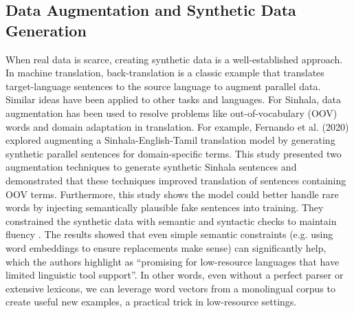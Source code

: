 \documentclass[12pt]{uomthesis}
\begin{document}
\subsection{Data Augmentation and Synthetic Data Generation}
When real data is scarce, creating synthetic data is a well-established approach. In machine translation, back-translation \cite{21} is a classic example that translates target-language sentences to the source language to augment parallel data. Similar ideas have been applied to other tasks and languages. For Sinhala, data augmentation has been used to resolve problems like out-of-vocabulary (OOV) words and domain adaptation in translation. For example, Fernando et al. (2020) \cite{22} explored augmenting a Sinhala-English-Tamil translation model by generating synthetic parallel sentences for domain-specific terms. This study presented two augmentation techniques to generate synthetic Sinhala sentences and demonstrated that these techniques improved translation of sentences containing OOV terms. Furthermore, this study shows the model could better handle rare words by injecting semantically plausible fake sentences into training. They constrained the synthetic data with semantic and syntactic checks to maintain fluency \cite{21}. The results showed that even simple semantic constraints (e.g. using word embeddings to ensure replacements make sense) can significantly help, which the authors highlight as “promising for low-resource languages that have limited linguistic tool support”. In other words, even without a perfect parser or extensive lexicons, we can leverage word vectors from a monolingual corpus to create useful new examples, a practical trick in low-resource settings.
\end{document}
